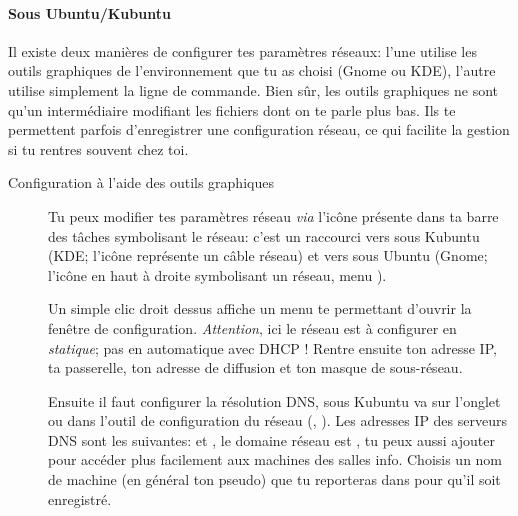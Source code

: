 \paragraph{Sous Ubuntu/Kubuntu}
\label{Ubuntu:IP}
Il existe deux manières de configurer tes paramètres réseaux: l'une utilise les outils graphiques de l'environnement que tu as choisi (Gnome ou KDE), l'autre utilise simplement la ligne de commande. Bien sûr, les outils graphiques ne sont qu'un intermédiaire modifiant les fichiers dont on te parle plus bas. Ils te permettent parfois d'enregistrer une configuration réseau, ce qui facilite la gestion si tu rentres souvent chez toi.

\begin{description}
\item[Configuration à l'aide des outils graphiques]
Tu peux modifier tes paramètres réseau \emph{via} l'icône présente dans ta barre des tâches symbolisant le réseau: c'est un raccourci vers  sous Kubuntu (KDE; l'icône représente un c\^able réseau) et vers  sous Ubuntu (Gnome; l'icône en haut à droite symbolisant un réseau, menu ).

Un simple clic droit dessus affiche un menu te permettant d'ouvrir la fenêtre de configuration. \emph{Attention}, ici le réseau est à configurer en \emph{statique}; pas en automatique avec DHCP ! Rentre ensuite ton adresse IP, ta passerelle, ton adresse de diffusion et ton masque de sous-réseau.

Ensuite il faut configurer la résolution DNS, sous Kubuntu va sur l'onglet  ou dans l'outil de configuration du réseau
(, ). Les adresses IP des serveurs DNS sont les suivantes:  et , le domaine réseau
est , tu peux aussi ajouter  pour accéder plus facilement aux machines des salles info. Choisis un nom de machine
(en général ton pseudo) que tu reporteras dans  pour qu'il soit enregistré.




\end{description}
